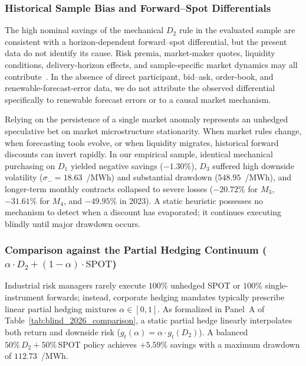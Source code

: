 \subsubsection{Historical Sample Bias and Forward--Spot Differentials}

The high nominal savings of the mechanical $D_2$ rule in the evaluated sample are consistent with a horizon-dependent forward--spot differential, but the present data do not identify its cause. Risk premia, market-maker quotes, liquidity conditions, delivery-horizon effects, and sample-specific market dynamics may all contribute~\cite{huisman2012electricity, woo2001cross}. In the absence of direct participant, bid--ask, order-book, and renewable-forecast-error data, we do not attribute the observed differential specifically to renewable forecast errors or to a causal market mechanism.

Relying on the persistence of a single market anomaly represents an unhedged speculative bet on market microstructure stationarity. When market rules change, when forecasting tools evolve, or when liquidity migrates, historical forward discounts can invert rapidly. In our empirical sample, identical mechanical purchasing on $D_1$ yielded negative savings ($-1.30\%$), $D_3$ suffered high downside volatility ($\sigma_- = 18.63$~\texteuro/MWh) and substantial drawdown ($548.95$~\texteuro/MWh), and longer-term monthly contracts collapsed to severe losses ($-20.72\%$ for $M_3$, $-31.61\%$ for $M_4$, and $-49.95\%$ in 2023). A static heuristic possesses no mechanism to detect when a discount has evaporated; it continues executing blindly until major drawdown occurs.

\subsubsection{Comparison against the Partial Hedging Continuum \texorpdfstring{($\alpha \cdot D_2 + (1-\alpha) \cdot \text{SPOT}$)}{(D2--SPOT Combinations)}}

Industrial risk managers rarely execute $100\%$ unhedged SPOT or $100\%$ single-instrument forwards; instead, corporate hedging mandates typically prescribe linear partial hedging mixtures $\alpha \in [0, 1]$. As formalized in Panel~A of Table~\ref{tab:blind_2026_comparison}, a static partial hedge linearly interpolates both return and downside risk ($g_t(\alpha) = \alpha \cdot g_t(D_2)$). A balanced $50\%\, D_2 + 50\%\, \text{SPOT}$ policy achieves $+5.59\%$ savings with a maximum drawdown of $112.73$~\texteuro/MWh.


